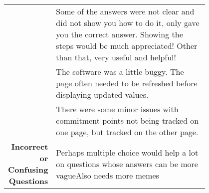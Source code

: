 {\begin{longtable}{R|p{0.8\linewidth}}
		& Some of the answers were not clear and did not show you how to do it, only gave you the correct answer. Showing the steps would be much appreciated! Other than that, very useful and helpful!                                                                                                                                                                                                                                                                                                                                                                                                                                                                                                                                                   \\
		& The software was a little buggy. The page often needed to be refreshed before displaying updated values.                                                                                                                                                                                                                                                                                                                                                                                                                                                                                                                                                                                                                                         \\
		& There were some minor issues with commitment points not being tracked on one page, but tracked on the other page.                                                                                                                                                                                                                                                                                                                                                                                                                                                                                                                                                                                                                                \\
		\hline
		\textbf{Incorrect or Confusing Questions} & Perhaps multiple choice would help a lot on questions whose answers can be more vagueAlso needs more memes                                                                                                                                                                                                                                                                                                                                                                                                                                                                                                                                                                                                                                       \\

\end{longtable}}
